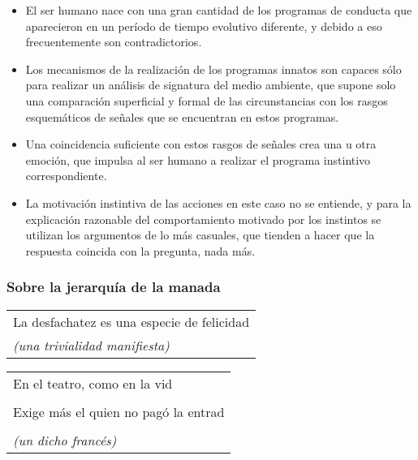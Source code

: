 \begin{itemize}
\tightlist
\item
  El ser humano nace con una gran cantidad de los programas de conducta
  que aparecieron en un período de tiempo evolutivo diferente, y debido
  a eso frecuentemente son contradictorios.
\item
  Los mecanismos de la realización de los programas innatos son capaces
  sólo para realizar un análisis de signatura del medio ambiente, que
  supone solo una comparación superficial y formal de las circunstancias
  con los rasgos esquemáticos de señales que se encuentran en estos
  programas.
\item
  Una coincidencia suficiente con estos rasgos de señales crea una u
  otra emoción, que impulsa al ser humano a realizar el programa
  instintivo correspondiente.
\item
  La motivación instintiva de las acciones en este caso no se entiende,
  y para la explicación razonable del comportamiento motivado por los
  instintos se utilizan los argumentos de lo más casuales, que tienden a
  hacer que la respuesta coincida con la pregunta, nada más.
\end{itemize}

\protect\hypertarget{M8}{}{}

\hypertarget{sobre-la-jerarquuxeda-de-la-manada}{\subsubsection{Sobre la
jerarquía de la manada}\label{sobre-la-jerarquuxeda-de-la-manada}}

\begin{longtable}[]{@{}l@{}}
\toprule
La desfachatez es una especie de felicidad\tabularnewline
\emph{(una trivialidad manifiesta)}\tabularnewline
\bottomrule
\end{longtable}

\begin{longtable}[]{@{}l@{}}
\toprule
En el teatro, como en la vid\tabularnewline
\tabularnewline
Exige más el quien no pagó la entrad\tabularnewline
\tabularnewline
\emph{(un dicho francés)}\tabularnewline
\bottomrule
\end{longtable}

